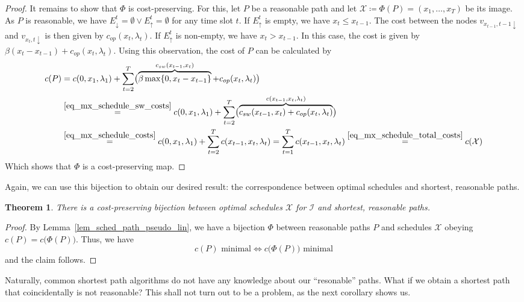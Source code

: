 \documentclass[hidelinks]{article}
\theoremstyle{plain}
\newtheorem{thm}{Theorem}[section]
\theoremstyle{definition}
\theoremstyle{rem}
\newcommand{\mx}{\mathcal{X}}
\newcommand{\inp}{\mathcal{I}}
\newcommand{\costs}{c}
\newcommand{\opcosts}{c_{op}}
\newcommand{\swcosts}{c_{sw}}
\begin{document}
\begin{proof}
It remains to show that $\Phi$ is cost-preserving. For this, let $P$ be a reasonable path and let $\mx\coloneqq\Phi(P)=(x_1,\ldots,x_T)$ be its image. 
As $P$ is reasonable, we have $E_\downarrow^t=\emptyset \lor E_\uparrow^t=\emptyset$ for any time slot $t$. If $E_\uparrow^t$ is empty, we have $x_t\le x_{t-1}$. The cost between the nodes $v_{x_{t-1},t-1\downarrow}$ and $v_{x_t,t\downarrow}$ is then given by $\opcosts(x_t,\lambda_t)$. If $E_\uparrow^t$ is non-empty, we have $x_t>x_{t-1}$. In this case, the cost is given by $\beta(x_t-x_{t-1})+\opcosts(x_t,\lambda_t)$. Using this observation, the cost of $P$ can be calculated by 
\begin{align*}
	\costs(P)&=c(0,x_1,\lambda_1)+\sum\limits_{t=2}^{T}\bigl(\overbrace{\beta\max\{0,x_t-x_{t-1}\}}^{\swcosts(x_{t-1},x_t)}+\opcosts(x_{t},\lambda_t)\bigr)\\
	&\stackrel{\eqref{eq_mx_schedule_sw_costs}}{=}c(0,x_1,\lambda_1)+\sum\limits_{t=2}^{T}\bigl(\overbrace{\swcosts(x_{t-1},x_t)+\opcosts(x_{t},\lambda_t)}^{\costs(x_{t-1},x_t,\lambda_t)}\bigr)\\
	&\stackrel{\eqref{eq_mx_schedule_costs}}{=}c(0,x_1,\lambda_1)+\sum\limits_{t=2}^{T}\costs(x_{t-1},x_t,\lambda_t)=\sum\limits_{t=1}^{T}\costs(x_{t-1},x_t,\lambda_t)\stackrel{\eqref{eq_mx_schedule_total_costs}}{=}c(\mx)
\end{align*}
Which shows that $\Phi$ is a cost-preserving map.
\end{proof}
Again, we can use this bijection to obtain our desired result: the correspondence between optimal schedules and shortest, reasonable paths.
\begin{thm}\label{thm_opt_sched_reasn_path}
There is a cost-preserving bijection between optimal schedules $\mx$ for $\inp$ and shortest, reasonable paths.
\end{thm} 
\begin{proof}
By Lemma~\ref{lem_sched_path_pseudo_lin}, we have a bijection $\Phi$ between reasonable paths $P$ and schedules $\mx$ obeying $\costs(P)=\costs\bigl(\Phi(P)\bigr)$. Thus, we have 
\begin{equation*}
	\costs(P)\text{ minimal}\iff \costs\bigl(\Phi(P)\big)\text{ minimal}
\end{equation*}
and the claim follows.
\end{proof}
Naturally, common shortest path algorithms do not have any knowledge about our ``resonable'' paths. What if we obtain a shortest path that coincidentally is not reasonable? This shall not turn out to be a problem, as the next corollary shows us.
\end{document}
